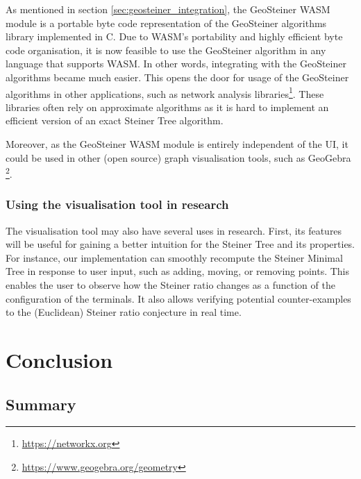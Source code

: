 \documentclass{l4proj}
\begin{document}
As mentioned in section \ref{sec:geosteiner_integration}, the GeoSteiner WASM module is a portable byte code representation of the GeoSteiner algorithms library implemented in C. Due to WASM's portability and highly efficient byte code organisation, it is now feasible to use the GeoSteiner algorithm in any language that supports WASM. In other words, integrating with the GeoSteiner algorithms became much easier. This opens the door for usage of the GeoSteiner algorithms in other applications, such as network analysis libraries\footnote[5]{\url{https://networkx.org}}. These libraries often rely on approximate algorithms as it is hard to implement an efficient version of an exact Steiner Tree algorithm.

Moreover, as the GeoSteiner WASM module is entirely independent of the UI, it could be used in other (open source) graph visualisation tools, such as GeoGebra \footnote[6]{\url{https://www.geogebra.org/geometry}}.
\subsection{Using the visualisation tool in research}
\label{sec:research_uses}
The visualisation tool may also have several uses in research. First, its features will be useful for gaining a better intuition for the Steiner Tree and its properties. For instance, our implementation can smoothly recompute the Steiner Minimal Tree in response to user input, such as adding, moving, or removing points. This enables the user to observe how the Steiner ratio changes as a function of the configuration of the terminals. It also allows verifying potential counter-examples to the (Euclidean) Steiner ratio conjecture in real time.

\chapter{Conclusion}
\label{sec:conclusion}
\section{Summary}
\end{document}
